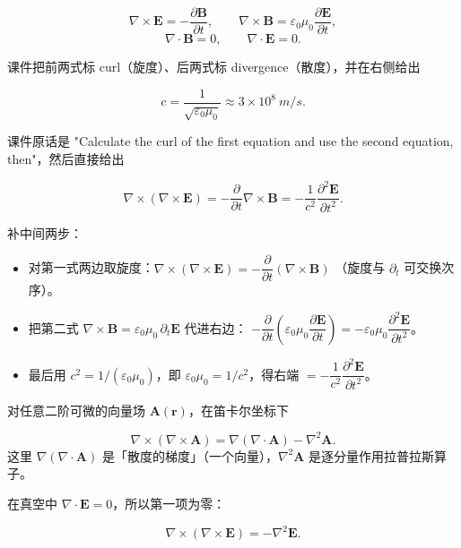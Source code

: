 
\[
\nabla\times\mathbf E=-\frac{\partial\mathbf B}{\partial t},
\qquad
\nabla\times\mathbf B=\varepsilon_0\mu_0\frac{\partial\mathbf E}{\partial t},
\]
\[
\nabla\cdot\mathbf B=0,
\qquad
\nabla\cdot\mathbf E=0 .
\]

课件把前两式标 curl（旋度）、后两式标 divergence（散度），并在右侧给出

\[
c=\frac{1}{\sqrt{\varepsilon_0\mu_0}}\approx3\times10^{8}\ \unit{m/s}.
\]


课件原话是 "Calculate the curl of the first equation and use the second equation, then"，然后直接给出

\[
\nabla\times(\nabla\times\mathbf E)=-\frac{\partial}{\partial t}\nabla\times\mathbf B=-\frac{1}{c^2}\frac{\partial^2\mathbf E}{\partial t^2}.
\]

补中间两步：

\begin{itemize}
\item 对第一式两边取旋度：$\nabla\times(\nabla\times\mathbf E)=-\dfrac{\partial}{\partial t}(\nabla\times\mathbf B)$
      （旋度与 $\partial_t$ 可交换次序）。
\item 把第二式 $\nabla\times\mathbf B=\varepsilon_0\mu_0\,\partial_t\mathbf E$ 代进右边：
      $-\dfrac{\partial}{\partial t}\left(\varepsilon_0\mu_0\dfrac{\partial\mathbf E}{\partial t}\right)
      =-\varepsilon_0\mu_0\dfrac{\partial^2\mathbf E}{\partial t^2}$。
\item 最后用 $c^2=1/(\varepsilon_0\mu_0)$，即 $\varepsilon_0\mu_0=1/c^2$，得右端 $=-\dfrac{1}{c^2}\dfrac{\partial^2\mathbf E}{\partial t^2}$。
\end{itemize}


对任意二阶可微的向量场 $\mathbf A(\mathbf r)$，在笛卡尔坐标下

\[
\nabla\times(\nabla\times\mathbf A)=\nabla(\nabla\cdot\mathbf A)-\nabla^2\mathbf A .
\]
这里 $\nabla(\nabla\cdot\mathbf A)$ 是「散度的梯度」（一个向量），$\nabla^2\mathbf A$ 是逐分量作用拉普拉斯算子。

在真空中 $\nabla\cdot\mathbf E=0$，所以第一项为零：

\[
\nabla\times(\nabla\times\mathbf E)=-\nabla^2\mathbf E .
\]

